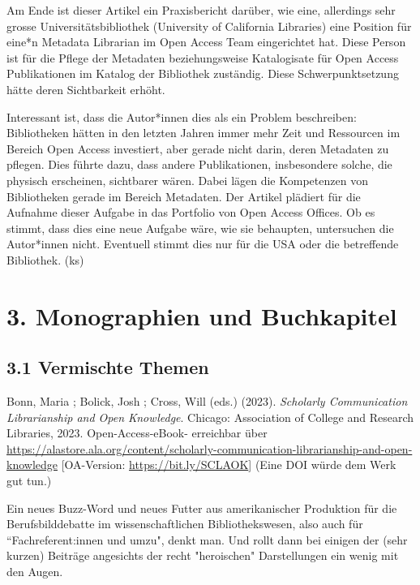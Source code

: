 \documentclass[a4paper,
fontsize=11pt,
oneside,
numbers=noperiodatend,
parskip=half-,
bibliography=totoc,
final
]{scrartcl}
\begin{document}
Am Ende ist dieser Artikel ein Praxisbericht darüber, wie eine,
allerdings sehr grosse Universitätsbibliothek (University of California
Libraries) eine Position für eine*n Metadata Librarian im Open Access
Team eingerichtet hat. Diese Person ist für die Pflege der Metadaten
beziehungsweise Katalogisate für Open Access Publikationen im Katalog
der Bibliothek zuständig. Diese Schwerpunktsetzung hätte deren
Sichtbarkeit erhöht.

Interessant ist, dass die Autor*innen dies als ein Problem beschreiben:
Bibliotheken hätten in den letzten Jahren immer mehr Zeit und Ressourcen
im Bereich Open Access investiert, aber gerade nicht darin, deren
Metadaten zu pflegen. Dies führte dazu, dass andere Publikationen,
insbesondere solche, die physisch erscheinen, sichtbarer wären. Dabei
lägen die Kompetenzen von Bibliotheken gerade im Bereich Metadaten. Der
Artikel plädiert für die Aufnahme dieser Aufgabe in das Portfolio von
Open Access Offices. Ob es stimmt, dass dies eine neue Aufgabe wäre, wie
sie behaupten, untersuchen die Autor*innen nicht. Eventuell stimmt dies
nur für die USA oder die betreffende Bibliothek. (ks)

\hypertarget{monographien-und-buchkapitel}{%
\section{3. Monographien und
Buchkapitel}\label{monographien-und-buchkapitel}}

\hypertarget{vermischte-themen-1}{%
\subsection{3.1 Vermischte Themen}\label{vermischte-themen-1}}

Bonn, Maria ; Bolick, Josh ; Cross, Will (eds.) (2023). \emph{Scholarly
Communication Librarianship and Open Knowledge}. Chicago: Association of
College and Research Libraries, 2023. Open-Access-eBook- erreichbar über
\url{https://alastore.ala.org/content/scholarly-communication-librarianship-and-open-knowledge}
{[}OA-Version: \url{https://bit.ly/SCLAOK}{]} (Eine DOI würde dem Werk
gut tun.)

Ein neues Buzz-Word und neues Futter aus amerikanischer Produktion für
die Berufsbilddebatte im wissenschaftlichen Bibliothekswesen, also auch
für ``Fachreferent:innen und umzu", denkt man. Und rollt dann bei
einigen der (sehr kurzen) Beiträge angesichts der recht "heroischen"
Darstellungen ein wenig mit den Augen.
\end{document}
